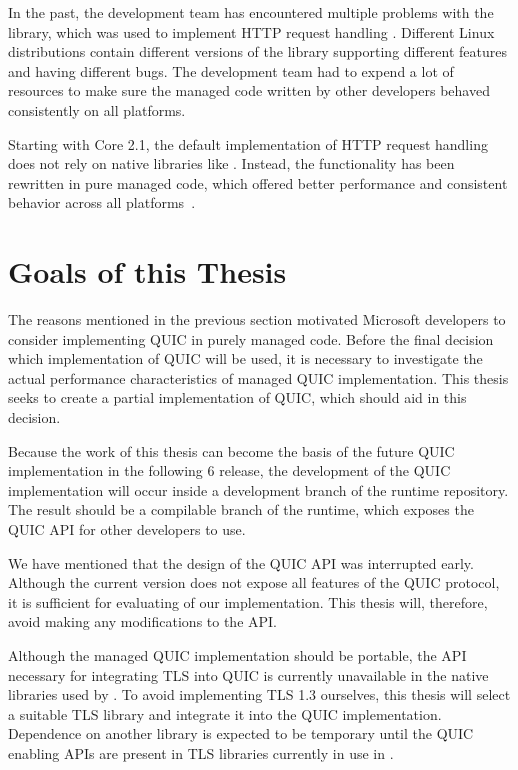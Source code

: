 In the past, the \dotnet{} development team has encountered multiple problems with the
\libcurl~\cite{curlGithub} library, which was used to implement HTTP request handling . Different
Linux distributions contain different versions of the \libcurl{} library supporting different
features and having different bugs. The \dotnet{} development team had to expend a lot of resources to make sure
the managed code written by other \dotnet{} developers behaved consistently on all platforms.

Starting with \dotnet{} Core 2.1, the default implementation of HTTP request handling does not rely
on native libraries like \libcurl{}. Instead, the functionality has been rewritten in pure managed
code, which offered better performance and consistent behavior across all \dotnet{}
platforms~\cite{SocketsHttpHandlerDocs}.

\section{Goals of this Thesis}

The reasons mentioned in the previous section motivated Microsoft developers to consider
implementing QUIC in purely managed \csharp{} code. Before the final decision which implementation
of QUIC will be used, it is necessary to investigate the actual performance characteristics of
managed QUIC implementation. This thesis seeks to create a partial implementation of QUIC, which
should aid in this decision.

Because the work of this thesis can become the basis of the future QUIC implementation in the
following \dotnet{} 6 release, the development of the QUIC implementation will occur inside a
development branch of the \dotnet{} runtime repository. The result should be a compilable branch of
the runtime, which exposes the QUIC API for other \dotnet{} developers to use.

We have mentioned that the design of the QUIC API was interrupted early. Although the current
version does not expose all features of the QUIC protocol, it is sufficient for evaluating of our
implementation. This thesis will, therefore, avoid making any modifications to the API\@.

Although the managed QUIC implementation should be portable, the API necessary for integrating TLS
into QUIC is currently unavailable in the native libraries used by \dotnet{}. To avoid implementing
TLS 1.3 ourselves, this thesis will select a suitable TLS library and integrate it into the QUIC
implementation. Dependence on another library is expected to be temporary until the QUIC enabling
APIs are present in TLS libraries currently in use in \dotnet{}.

